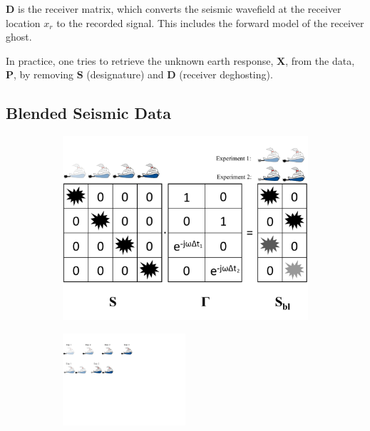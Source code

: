 $\mathbf{D}$ is the receiver matrix, which converts the seismic wavefield at the receiver location $x_r$ to the recorded signal. This includes the forward model of the receiver ghost.

In practice, one tries to retrieve the unknown earth response, $\mathbf{X}$, from the data, $\mathbf{P}$, by removing $\mathbf{S}$ (designature) and $\mathbf{D}$ (receiver deghosting).



\subsection{Blended Seismic Data}

\begin{figure}
	
	\centering
	\begin{subfigure}[t]{0.6\textwidth}	
	\includegraphics[width=\textwidth]{Plots/Blended-Source-edit2}
	\caption{}
	\label{fig:Ch-Theory-BlendedSource-Matrices}
	\end{subfigure}
	\par\bigskip
	\begin{subfigure}[t]{\textwidth}
	\centering
	\includegraphics[width=0.5\textwidth]{Plots/Blended-Source-Conventional}

\end{subfigure}
\end{figure}
